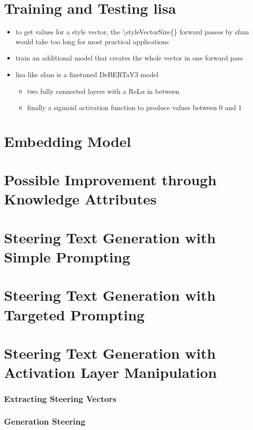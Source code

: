 \section{Training and Testing \acs{lisa}}
\label{sec:approach:lisa}
\begin{itemize}
  \item to get values for a style vector, the \num{\styleVectorSize{}} forward passes by \ac{sfam} would take too long for most practical applications
  \item train an additional model that creates the whole vector in one forward pass
  \item \ac{lisa} like \ac{sfam} is a finetuned DeBERTaV3 model
        \begin{itemize}
          \item two fully connected layers with a ReLu in between %
          \item finally a sigmoid activation function to produce values between 0 and 1
        \end{itemize}
\end{itemize}

\section{Embedding Model}
\label{sec:approach:embedding}


\section{Possible Improvement through Knowledge Attributes}
\label{sec:approach:knowledge_attributes}


\section{Steering Text Generation with Simple Prompting}
\label{sec:approach:steering:simple}


\section{Steering Text Generation with Targeted Prompting}
\label{sec:approach:steering:targeted}


\section{Steering Text Generation with Activation Layer Manipulation}
\label{sec:approach:steering:actAdd}

\subsubsection{Extracting Steering Vectors}

\subsubsection{Generation Steering}